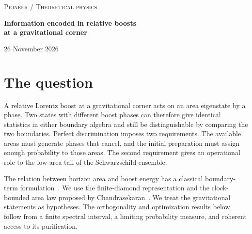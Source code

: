 \documentclass[11pt,letterpaper]{article}
\newcommand{\sg}{s_*}
\begin{document}
\begin{center}
{\small\scshape Pioneer \enspace / \enspace Theoretical physics}\par
\vspace{0.65em}
{\LARGE\bfseries Information encoded in relative boosts\\[2pt]
at a gravitational corner}\par
\vspace{0.5em}
{\small 26 November 2026}
\end{center}

\begin{abstract}
How small a change of relative frame can two gravitational boundaries distinguish in a single preparation? We take as inputs the area-generated boost and the limiting area distribution of a clock-bounded Schwarzschild causal diamond. A coherent acceptance filter acts on area, and an integer multiple of a real boost encodes the message. For fixed alphabet size $M$, nonvanishing preparation probability and exact orthogonality in all sufficiently large finite diamonds are possible precisely when $\eta\sg>4\pi^2(1-1/M)$, where $\sg$ is the area bound in units of $4G_N\hbar$. Every individual boundary has the same density matrix for every message. Near the binary threshold $\eta_c=2\pi^2/\sg$, the optimal probability is asymptotic to $2[(p+1)/p]^p(1-\eta_c/\eta)^p$. The exponent $p=257/90$ comes from the proposed one-loop area law. We identify the optimal filter, give a one-way decoder, and bound the area mixing required by its readout. An explicit four-message preparation succeeds with limiting probability $0.39453246$.
\end{abstract}

\section{The question}
A relative Lorentz boost at a gravitational corner acts on an area eigenstate by a phase. Two states with different boost phases can therefore give identical statistics in either boundary algebra and still be distinguishable by comparing the two boundaries. Perfect discrimination imposes two requirements. The available areas must generate phases that cancel, and the initial preparation must assign enough probability to those areas. The second requirement gives an operational role to the low-area tail of the Schwarzschild ensemble.

The relation between horizon area and boost energy has a classical boundary-term formulation~\cite{bianchi}. We use the finite-diamond representation and the clock-bounded area law proposed by Chandrasekaran~\cite{chandra}. We treat the gravitational statements as hypotheses. The orthogonality and optimization results below follow from a finite spectral interval, a limiting probability measure, and coherent access to its purification.
\end{document}
